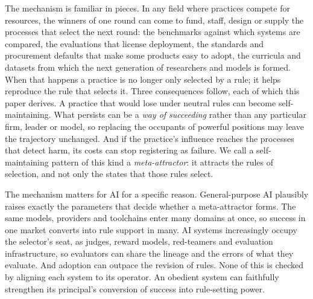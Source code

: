 \documentclass[letterpaper]{article} %
\theoremstyle{definition}
\begin{document}
The mechanism is familiar in pieces. In any field where practices compete for resources, the winners of one round can come to fund, staff, design or supply the processes that select the next round: the benchmarks against which systems are compared, the evaluations that license deployment, the standards and procurement defaults that make some products easy to adopt, the curricula and datasets from which the next generation of researchers and models is formed. When that happens a practice is no longer only selected by a rule; it helps reproduce the rule that selects it. Three consequences follow, each of which this paper derives. A practice that would lose under neutral rules can become self-maintaining. What persists can be a \emph{way of succeeding} rather than any particular firm, leader or model, so replacing the occupants of powerful positions may leave the trajectory unchanged. And if the practice's influence reaches the processes that detect harm, its costs can stop registering as failure. We call a self-maintaining pattern of this kind a \emph{meta-attractor}: it attracts the rules of selection, and not only the states that those rules select.

The mechanism matters for AI for a specific reason. General-purpose AI plausibly raises exactly the parameters that decide whether a meta-attractor forms. The same models, providers and toolchains enter many domains at once, so success in one market converts into rule support in many. AI systems increasingly occupy the selector's seat, as judges, reward models, red-teamers and evaluation infrastructure, so evaluators can share the lineage and the errors of what they evaluate. And adoption can outpace the revision of rules. None of this is checked by aligning each system to its operator. An obedient system can faithfully strengthen its principal's conversion of success into rule-setting power.
\end{document}
